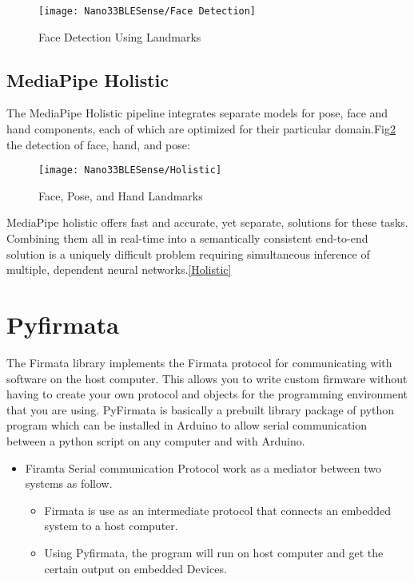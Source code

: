 \begin{figure}[h]
	\centering
	\texttt{[image: Nano33BLESense/Face Detection]}
	\caption{Face Detection Using Landmarks}
	\label{Face Detection Using Landmarks}
\end{figure}

\subsection{MediaPipe Holistic}

The MediaPipe Holistic pipeline integrates separate models for pose, face and hand components, each of which are optimized for their particular domain.Fig\ref{Face, Pose, and Hand Landmarks} the detection of face, hand, and pose:

\begin{figure}[h]
	\centering
	\texttt{[image: Nano33BLESense/Holistic]}
	\caption{Face, Pose, and Hand Landmarks}
	\label{Face, Pose, and Hand Landmarks}
\end{figure}

MediaPipe holistic offers fast and accurate, yet separate, solutions for these tasks. Combining them all in real-time into a semantically consistent end-to-end solution is a uniquely difficult problem requiring simultaneous inference of multiple, dependent neural networks.\href{https://google.github.io/mediapipe/solutions/holistic.html}{[Holistic]}

\section{Pyfirmata}

The Firmata library implements the Firmata protocol for communicating with software on the host computer. This allows you to write custom firmware without having to create your own protocol and objects for the programming environment that you are using. PyFirmata is basically a prebuilt library package of python program which can be installed in Arduino to allow serial communication between a python script on any computer and with Arduino.
\begin{itemize}
	\item Firamta Serial communication Protocol work as a mediator between two systems as follow.
	\begin{itemize}
		\item Firmata is use as an intermediate protocol that connects an
		embedded system to a host computer.
		\item Using Pyfirmata, the program will run on host computer and get the
		certain output on embedded Devices.
	\end{itemize}
\end{itemize}


